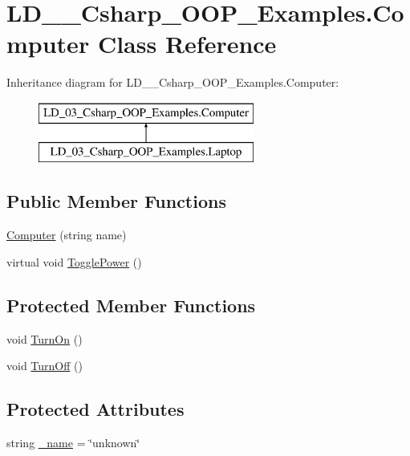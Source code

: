 \hypertarget{class_l_d__03___csharp___o_o_p___examples_1_1_computer}{}\section{L\+D\+\_\+\_\+\+Csharp\+\_\+\+O\+O\+P\+\_\+\+Examples.\+Computer Class Reference}
\label{class_l_d__03___csharp___o_o_p___examples_1_1_computer}
Inheritance diagram for L\+D\+\_\+\_\+\+Csharp\+\_\+\+O\+O\+P\+\_\+\+Examples.\+Computer\+:\begin{figure}[H]
\begin{center}
\leavevmode
\includegraphics[height=2.000000cm]{class_l_d__03___csharp___o_o_p___examples_1_1_computer}
\end{center}
\end{figure}
\subsection*{Public Member Functions}
\begin{DoxyCompactItemize}
\item 
\mbox{\hyperlink{class_l_d__03___csharp___o_o_p___examples_1_1_computer_a82a05be010b5fa53346c89f89ec91e6d}{Computer}} (string name)
\item 
virtual void \mbox{\hyperlink{class_l_d__03___csharp___o_o_p___examples_1_1_computer_af134a7a02923b27cf3f15a4108354cd5}{Toggle\+Power}} ()
\end{DoxyCompactItemize}
\subsection*{Protected Member Functions}
\begin{DoxyCompactItemize}
\item 
void \mbox{\hyperlink{class_l_d__03___csharp___o_o_p___examples_1_1_computer_a578c225b5842fa789832d8da9731bca0}{Turn\+On}} ()
\item 
void \mbox{\hyperlink{class_l_d__03___csharp___o_o_p___examples_1_1_computer_aa53a1cb176fe267bd05314373b6d114c}{Turn\+Off}} ()
\end{DoxyCompactItemize}
\subsection*{Protected Attributes}
\begin{DoxyCompactItemize}
\item 
string \mbox{\hyperlink{class_l_d__03___csharp___o_o_p___examples_1_1_computer_a98394d23bbf46e8aee551c746d0a0d33}{\+\_\+name}} = \char`\"{}unknown\char`\"{}
\end{DoxyCompactItemize}
